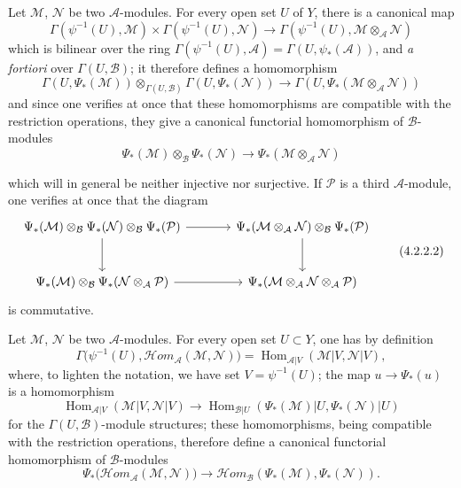 \begin{env}[4.2.2]
\label{0.4.2.2}
Let $\mathcal{M}$, $\mathcal{N}$ be two $\mathcal{A}$-modules. For every
open set $U$ of $Y$, there is a canonical map
\[
  \Gamma(\psi^{-1}(U),\mathcal{M})
  \times\Gamma(\psi^{-1}(U),\mathcal{N})
  \longrightarrow
  \Gamma(\psi^{-1}(U),\mathcal{M}\otimes_{\mathcal{A}}\mathcal{N})
\]
which is bilinear over the ring
$\Gamma(\psi^{-1}(U),\mathcal{A})=\Gamma(U,\psi_*(\mathcal{A}))$, and
\emph{a fortiori} over $\Gamma(U,\mathcal{B})$; it therefore defines a
homomorphism
\[
  \Gamma(U,\Psi_*(\mathcal{M}))
  \otimes_{\Gamma(U,\mathcal{B})}
  \Gamma(U,\Psi_*(\mathcal{N}))
  \longrightarrow
  \Gamma(U,\Psi_*(\mathcal{M}\otimes_{\mathcal{A}}\mathcal{N}))
\]
and since one verifies at once that these homomorphisms are compatible with
the restriction operations, they give a canonical functorial homomorphism
of $\mathcal{B}$-modules
\[
  \Psi_*(\mathcal{M})\otimes_{\mathcal{B}}\Psi_*(\mathcal{N})
  \longrightarrow
  \Psi_*(\mathcal{M}\otimes_{\mathcal{A}}\mathcal{N})
  \tag{4.2.2.1}\label{0.4.2.2.1}
\]

which will in general be neither injective nor surjective. If $\mathcal{P}$ is a
third $\mathcal{A}$-module, one verifies at once that the diagram
\[
\begin{tikzcd}[column sep=large,row sep=large]
\Psi_*(\mathcal{M})\otimes_{\mathcal{B}}\Psi_*(\mathcal{N})
  \otimes_{\mathcal{B}}\Psi_*(\mathcal{P})
  \arrow[r]
  \arrow[d]
&
\Psi_*(\mathcal{M}\otimes_{\mathcal{A}}\mathcal{N})
  \otimes_{\mathcal{B}}\Psi_*(\mathcal{P})
  \arrow[d]
\\
\Psi_*(\mathcal{M})\otimes_{\mathcal{B}}
  \Psi_*(\mathcal{N}\otimes_{\mathcal{A}}\mathcal{P})
  \arrow[r]
&
\Psi_*(\mathcal{M}\otimes_{\mathcal{A}}\mathcal{N}
  \otimes_{\mathcal{A}}\mathcal{P})
\end{tikzcd}
\tag{4.2.2.2}\label{0.4.2.2.2}
\]
is commutative.
\end{env}

\begin{env}[4.2.3]
\label{0.4.2.3}
Let $\mathcal{M}$, $\mathcal{N}$ be two $\mathcal{A}$-modules. For every
open set $U\subset Y$, one has by definition
\[
  \Gamma\bigl(\psi^{-1}(U),
    \mathcal{H}\!om_{\mathcal{A}}(\mathcal{M},\mathcal{N})\bigr)
  =
  \operatorname{Hom}_{\mathcal{A}|V}
    (\mathcal{M}|V,\mathcal{N}|V),
\]
where, to lighten the notation, we have set $V=\psi^{-1}(U)$; the map
$u\to\Psi_*(u)$ is a homomorphism
\[
  \operatorname{Hom}_{\mathcal{A}|V}(\mathcal{M}|V,\mathcal{N}|V)
  \longrightarrow
  \operatorname{Hom}_{\mathcal{B}|U}
    (\Psi_*(\mathcal{M})|U,\Psi_*(\mathcal{N})|U)
\]
for the $\Gamma(U,\mathcal{B})$-module structures; these homomorphisms,
being compatible with the restriction operations, therefore define a
canonical functorial homomorphism of $\mathcal{B}$-modules
\[
  \Psi_*\bigl(\mathcal{H}\!om_{\mathcal{A}}(\mathcal{M},\mathcal{N})\bigr)
  \longrightarrow
  \mathcal{H}\!om_{\mathcal{B}}
    (\Psi_*(\mathcal{M}),\Psi_*(\mathcal{N})).
  \tag{4.2.3.1}\label{0.4.2.3.1}
\]
\end{env}

